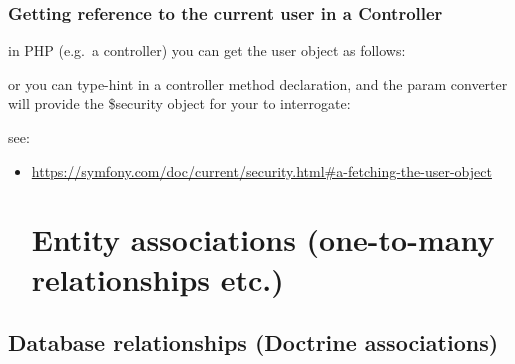 \documentclass[a4paperpaper,openright]{book}
\newenvironment{Shaded}{}{}
\newcommand{\KeywordTok}[1]{\textcolor[rgb]{0.00,0.44,0.13}{\textbf{#1}}}
\newcommand{\NormalTok}[1]{#1}
\newcommand{\OtherTok}[1]{\textcolor[rgb]{0.00,0.44,0.13}{#1}}
\providecommand{\tightlist}{%
  \setlength{\itemsep}{0pt}\setlength{\parskip}{0pt}}
\begin{document}
\hypertarget{getting-reference-to-the-current-user-in-a-controller}{%
\section{Getting reference to the current user in a
Controller}\label{getting-reference-to-the-current-user-in-a-controller}}

in PHP (e.g.~a controller) you can get the user object as follows:

\begin{Shaded}
\end{Shaded}

or you can type-hint in a controller method declaration, and the param
converter will provide the \$security object for your to interrogate:

\begin{Shaded}
\end{Shaded}

see:

\begin{itemize}
\tightlist
\item
  \url{https://symfony.com/doc/current/security.html\#a-fetching-the-user-object}

  \part{Entity associations (one-to-many relationships etc.)}
\end{itemize}

\hypertarget{database-relationships-doctrine-associations}{%
\chapter{Database relationships (Doctrine
associations)}\label{database-relationships-doctrine-associations}}
\end{document}
